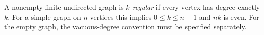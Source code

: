 
A nonempty finite undirected graph is \emph{$k$-regular} if every vertex has degree exactly $k$. For a simple graph on $n$ vertices this implies $0\le k\le n-1$ and $nk$ is even. For the empty graph, the vacuous-degree convention must be specified separately.
